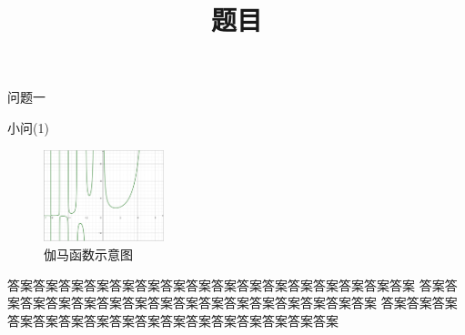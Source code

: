 \documentclass[windows,list,answers]{BHCexam}
\begin{document}
\everymath{\displaystyle}
\title{题目}

\maketitle

\begin{questions}
    \question
    问题一
    \begin{subquestions}
        \subquestion
        小问(1)
        \begin{solution}{1cm}
            \methodonly
            \begin{minipage}{\linewidth}
                \begin{figure}
                    \vspace{-0.5cm}
                    \includegraphics[width=3.5cm]{example.png}
                    \caption{伽马函数示意图}
                \end{figure}
                答案答案答案答案答案答案答案答案答案答案答案答案答案答案答案答案
                答案答案答案答案答案答案答案答案答案答案答案答案答案答案答案答案
                答案答案答案答案答案答案答案答案答案答案答案答案答案答案答案答案
            \end{minipage}
        \end{solution}
    \end{subquestions}
\end{questions}
\end{document}
